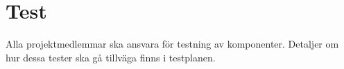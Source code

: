 \section{Test}
Alla projektmedlemmar ska ansvara för testning av komponenter. Detaljer om hur dessa tester ska gå tillväga finns i testplanen.
